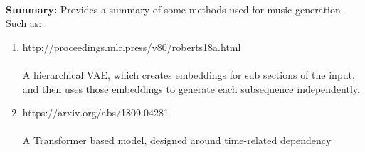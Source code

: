\documentclass{article}
\begin{document}
\begin{enumerate}
    \\
    \textbf{Summary:} Provides a summary of some methods used for music generation. Such as:\\
    \begin{enumerate}
        \item http://proceedings.mlr.press/v80/roberts18a.html\\
        \\
        A hierarchical VAE, which creates embeddings for sub sections of the input, and then uses those embeddings to generate each subsequence independently. 
        \\
        \item https://arxiv.org/abs/1809.04281\\
        \\ 
        A Transformer based model, designed around time-related dependency\\
    \end{enumerate}
\end{enumerate}
\end{document}
